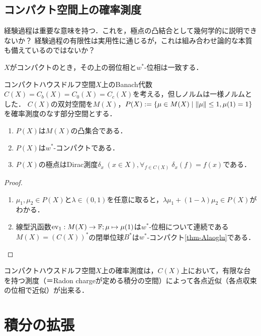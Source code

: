 \documentclass[uplatex,dvipdfmx]{jsreport}
\begin{document}
\subsection{コンパクト空間上の確率測度}

\begin{tcolorbox}[colframe=ForestGreen, colback=ForestGreen!10!white,breakable,colbacktitle=ForestGreen!40!white,coltitle=black,fonttitle=\bfseries\sffamily,
title=]
    経験過程は重要な意味を持つ．これを，極点の凸結合として幾何学的に説明できないか？
    経験過程の有限性は実用性に通じるが，これは組み合わせ論的な本質も備えているのではないか？

    $X$がコンパクトのとき，その上の弱位相と$w^*$-位相は一致する．
\end{tcolorbox}

\begin{proposition}
    コンパクトハウスドルフ空間$X$上のBanach代数$C(X)=C_b(X)=C_0(X)=C_c(X)$を考える，但しノルムは一様ノルムとした．
    $C(X)$の双対空間を$M(X)$，$P(X):=\left\{\mu\in M(X)\mid\|\mu\|\le 1,\mu(1)=1\right\}$を確率測度のなす部分空間とする．
    \begin{enumerate}
        \item $P(X)$は$M(X)$の凸集合である．
        \item $P(X)$は$w^*$-コンパクトである．
        \item $P(X)$の極点はDirac測度$\delta_x\;(x\in X),\forall_{f\in C(X)}\;\delta_x(f)=f(x)$である．
    \end{enumerate}
\end{proposition}
\begin{proof}\mbox{}
    \begin{enumerate}
        \item $\mu_1,\mu_2\in P(X)$と$\lambda\in(0,1)$を任意に取ると，$\lambda\mu_1+(1-\lambda)\mu_2\in P(X)$がわかる．
        \item 線型汎函数$\mathrm{ev}_1:M(X)\to\mathbb{F};\mu\mapsto\mu(1)$は$w^*$-位相について連続である
        $M(X)=(C(X))^*$の閉単位球$B^*$は$w^*$-コンパクト\ref{thm-Alaoglu}である．
    \end{enumerate}
\end{proof}
\begin{remarks}
    コンパクトハウスドルフ空間$X$上の確率測度は，$C(X)$上において，有限な台を持つ測度（＝Radon chargeが定める積分の空間）によって各点近似（各点収束の位相で近似）が出来る．
\end{remarks}


\section{積分の拡張}
\end{document}
